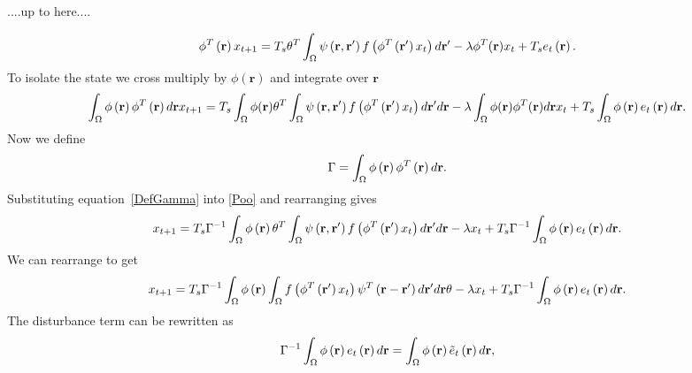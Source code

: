 \documentclass[onecolumn,draftcls]{IEEEtran}
\begin{document}
....up to here....

\begin{equation}\label{DecompModel}
{\phi ^T}\left( \mathbf{r} \right){x_{t+1}} = T_s\theta^T\int_\Omega  {\psi \left( {{\bf{r}} , {\mathbf{r'}}} \right)f\left( {{\phi ^T}\left( {{\mathbf{r'}}} \right){x_t}} \right)d{\mathbf{r'}}}  - \lambda\phi^T(\mathbf{r})x_t + T_s{e_t}\left( {\mathbf{r}} \right).
\end{equation}
To isolate the state we cross multiply by $\phi(\mathbf{r})$ and integrate over $\mathbf{r}$
\begin{equation}\label{Poo}
\int_\Omega  {\phi \left( {\bf{r}} \right){\phi ^T}\left( {\bf{r}} \right)d{\bf{r}}{x_{t+1}}}  = T_s\int_\Omega  {\phi ( \mathbf{r} )\theta^T\int_\Omega  {\psi \left( {{\bf{r}} , {\bf{r'}}} \right)f\left( {{\phi ^T}\left( {{\bf{r'}}} \right){x_t}} \right)d{\bf{r'}}} d{\bf{r}}}  - \lambda\int_\Omega \phi(\mathbf{r})\phi^T(\mathbf{r})d\mathbf{r} x_t  + T_s\int_\Omega  {\phi \left( {\mathbf{r}} \right)e_t\left( {\mathbf{r}} \right)d{\mathbf{r}}}.
\end{equation}
Now we define
\begin{equation}\label{DefGamma}
\Gamma  = \int_\Omega  {\phi \left( {\bf{r}} \right){\phi ^T}\left( {\bf{r}} \right)d{\bf{r}}}.
\end{equation}
Substituting equation~\ref{DefGamma} into \ref{Poo} and rearranging gives
\begin{equation}\label{SS Model}
{x_{t+1}} = T_s{\Gamma ^{ - 1}}\int_\Omega  {\phi \left( {\bf{r}} \right)\theta^T\int_\Omega  {\psi \left( {{\bf{r}} , {\bf{r'}}} \right)f\left( {{\phi ^T}\left( {{\bf{r'}}} \right){x_t}} \right)d{\bf{r'}}} d{\bf{r}}} - \lambda x_t + T_s{\Gamma ^{ - 1}}\int_\Omega  {\phi \left( {\bf{r}} \right)e_t\left( {\bf{r}} \right)d{\bf{r}}}.
\end{equation}
We can rearrange to get
\begin{equation}\label{Homogeneous SS Model}
	x_{t+1} = T_s\Gamma ^{ - 1}\int_\Omega  {\phi \left( {\bf{r}} \right)\int_\Omega  {f\left( {{\phi ^T}\left( {{\bf{r'}}} \right){x_t}} \right)\psi^T \left( {{\bf{r}} - {\bf{r'}}} \right)d{\bf{r'}}} d{\bf{r}}}\theta - \lambda x_t + T_s{\Gamma ^{ - 1}}\int_\Omega  {\phi \left( {\bf{r}} \right)e_t\left( {\bf{r}} \right)d{\bf{r}}}.
\end{equation}
The disturbance term can be rewritten as 
\begin{equation}
	\Gamma ^{ - 1}\int_\Omega  {\phi \left( \bf{r} \right)e_t\left( \bf{r} \right)d\bf{r}} = \int_\Omega  {\phi \left( \bf{r} \right)\tilde{e}_t\left( \bf{r} \right)d\bf{r}},
\end{equation}
\end{document}
